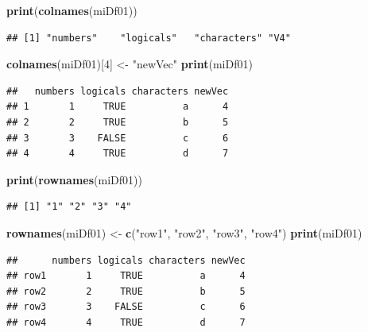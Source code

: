 \documentclass[twoside,symmetric]{book}
\newenvironment{Shaded}{}{}
\newcommand{\DecValTok}[1]{#1}
\newcommand{\KeywordTok}[1]{\textbf{#1}}
\newcommand{\NormalTok}[1]{#1}
\newcommand{\StringTok}[1]{#1}
\begin{document}
\begin{Shaded}
\begin{Highlighting}[]
\KeywordTok{print}\NormalTok{(}\KeywordTok{colnames}\NormalTok{(miDf01))}
\end{Highlighting}
\end{Shaded}

\begin{verbatim}
## [1] "numbers"    "logicals"   "characters" "V4"
\end{verbatim}

\begin{Shaded}
\begin{Highlighting}[]
\KeywordTok{colnames}\NormalTok{(miDf01)[}\DecValTok{4}\NormalTok{] <-}\StringTok{ "newVec"}
\KeywordTok{print}\NormalTok{(miDf01)}
\end{Highlighting}
\end{Shaded}

\begin{verbatim}
##   numbers logicals characters newVec
## 1       1     TRUE          a      4
## 2       2     TRUE          b      5
## 3       3    FALSE          c      6
## 4       4     TRUE          d      7
\end{verbatim}

\begin{Shaded}
\begin{Highlighting}[]
\KeywordTok{print}\NormalTok{(}\KeywordTok{rownames}\NormalTok{(miDf01))}
\end{Highlighting}
\end{Shaded}

\begin{verbatim}
## [1] "1" "2" "3" "4"
\end{verbatim}

\begin{Shaded}
\begin{Highlighting}[]
\KeywordTok{rownames}\NormalTok{(miDf01) <-}\StringTok{ }\KeywordTok{c}\NormalTok{(}\StringTok{"row1"}\NormalTok{, }\StringTok{"row2"}\NormalTok{, }\StringTok{"row3"}\NormalTok{, }\StringTok{"row4"}\NormalTok{)}
\KeywordTok{print}\NormalTok{(miDf01)}
\end{Highlighting}
\end{Shaded}

\begin{verbatim}
##      numbers logicals characters newVec
## row1       1     TRUE          a      4
## row2       2     TRUE          b      5
## row3       3    FALSE          c      6
## row4       4     TRUE          d      7
\end{verbatim}
\end{document}
